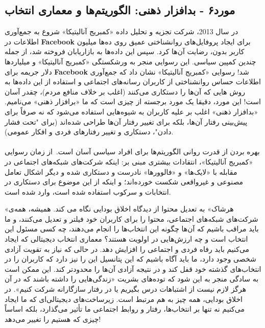 \documentclass[12pt,oneside]{book}
\begin{document}
    \subsection*{مورد۶ - بدافزار ذهنی: الگوریتم‌ها و معماری انتخاب}
    در سال 2013، شرکت تجزیه و تحلیل داده «کمبریج آنالیتیکا» شروع به جمع‌آوری اطلاعات در \textenglish{\textbf{Facebook}} برای ایجاد پروفایل‌های روانشناختی عمیق روی ده‌ها میلیون کاربر بدون، رضایت آن‌ها کرد.
    سپس این داده‌ها به بازاریابان فروخته شد، از جمله چندین کمپین سیاسی.
    این رسوایی منجر به ورشکستگی «کمبریج آنالیتیکا» و میلیاردها دلار جریمه برای \textenglish{\textbf{Facebook}} شد!
    رسوایی «کمبریج آنالیتیکا» نشان داد که جمع‌آوری اطلاعات حساس روانشناختی از کاربران رسانه‌های اجتماعی و استفاده از این داده‌ها به روش هایی که آن‌ها را دستکاری می‌کنند (اغلب بر خلاف منافع مردم)، چقدر آسان است!
    این مورد، دقیقا یک مورد برجسته از چیزی است که ما «برافزار ذهنی» می‌نامیم.
    «بدافزار ذهنی» اغلب بر علیه کاربران به شیوه‌هایی استفاده می‌شود که نه صرفاً برای پیش‌بینی رفتار آن‌ها، بلکه برای تغییر رفتار آن‌ها طراحی شده‌اند (برای "تحت فشار دادن"، دستکاری و تغییر رفتارهای فردی و افکار عمومی).

    \paragraph{}
    بهره بردن از قدرت روانی الگوریتم‌ها برای افراد سیاسی آسان است.\     از زمان رسوایی «کمبریج آنالیتیکا»، انتقادات بیشتری مبنی بر: اینکه شرکت‌های شبکه‌های اجتماعی در مقابله با «لایک‌ها» و «فالوورها» نادرست و دستکاری شده و دیگر اشکال تعامل مصنوعی و غیرواقعی شکست خورده‌اند؛ و اینکه از این موضوع برای دستکاری در انتخابات و سرکوب استفاده شده است، وارد شده است.

    «هرشاک» به تعدیل محتوا از دیدگاه اخلاق بودایی نگاه می کند.
    همیشه، همه‌ی شرکت‌های شبکه‌های اجتماعی، محتوا را برای کاربران خود فیلتر و تعدیل می‌کنند، و ما باید مراقب باشیم که آن‌ها چگونه این انتخاب‌ها را انجام می‌دهند، چه کسی مسئول این انتخاب است و چه ارزش‌هایی در اولویت هستند؟ معماری انتخاب دیجیتالی که ایجاد می‌کنیم باید رفاه فردی و اجتماعی را افزایش دهد.
    در حالی که نیاز به تقویت آزادی شخصی وجود دارد، ما باید آگاه باشیم که این پتانسیل این را نیز دارد که کاربران را در انتخاب‌های گذشته خود قفل کند و در نتیجه آزادی آن‌ها را محدودتر کند.
    این ممکن است به سادگی منجر به این شود که توده‌های بشریت «زندگی‌هایی را داشته باشند که در آن هرگز لازم نیست از اشتباهات درس بگیریم یا در رفتار سازگارانه شرکت کنیم».
    در اخلاق بودایی، همه چیز به هم مرتبط است.
    زیرساخت‌های دیجیتالی‌ای که ما ایجاد می‌کنیم نه تنها بر انتخاب‌ها، رفتار و روابط اجتماعی ما تأثیر می‌گذارد، بلکه اساساً چیزی که هستیم را تغییر می‌دهد!
\end{document}
